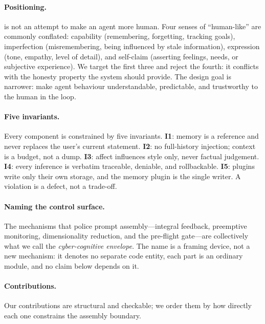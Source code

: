 \paragraph{Positioning.} \system{} is not an attempt to make an agent more
human. Four senses of ``human-like'' are commonly conflated: capability
(remembering, forgetting, tracking goals), imperfection (misremembering, being
influenced by stale information), expression (tone, empathy, level of detail),
and self-claim (asserting feelings, needs, or subjective experience). We target
the first three and reject the fourth: it conflicts with the honesty property
the system should provide. The design goal is narrower: make
agent behaviour understandable, predictable, and trustworthy to the human in the
loop.

\paragraph{Five invariants.} Every component is constrained by five
invariants. \textbf{I1}: memory is a reference and never replaces the user's
current statement. \textbf{I2}: no full-history injection; context is a budget,
not a dump. \textbf{I3}: affect influences style only, never factual judgement.
\textbf{I4}: every inference is verbatim traceable, deniable, and rollbackable.
\textbf{I5}: plugins write only their own storage, and the memory plugin is the
single writer. A violation is a defect, not a trade-off.

\paragraph{Naming the control surface.} The mechanisms that police prompt
assembly---integral feedback, preemptive monitoring, dimensionality reduction,
and the pre-flight gate---are collectively what we call the
\emph{cyber-cognitive envelope}. The name is a framing device, not a new
mechanism: it denotes no separate code entity, each part is an ordinary module,
and no claim below depends on it.

\paragraph{Contributions.} Our contributions are structural and checkable; we
order them by how directly each one constrains the assembly boundary.

